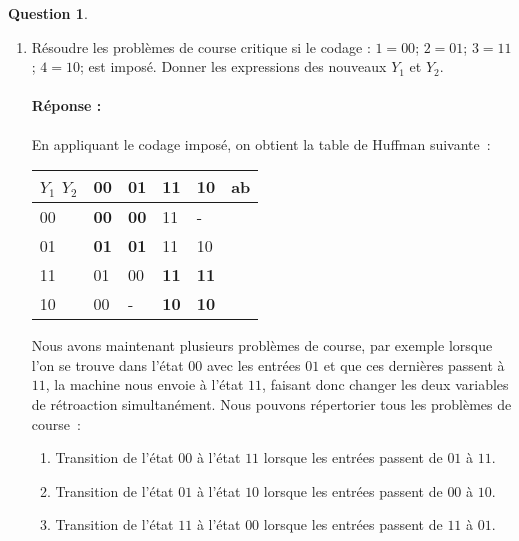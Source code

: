 \documentclass[11pt,a4paper,dvipsnames,]{article}
\theoremstyle{definition}%
\newtheorem{Q}{Question}[] %
\newcommand{\reponse}[1]{%
	\ifthenelse {\boolean{corrige}} {\paragraph{Réponse :} \color{darkblue}   #1\color{black}} {}
 }
\begin{document}
\begin{Q}
\begin{enumerate}
{			Attention~: lors de l'établissement des k-maps, il faut veiller à réordonner la table pour respecter une distance de Hamming de 1 entre les cases voisines.

			\begin{center}

			\end{center}


		}
		\item Résoudre les problèmes de course critique si le codage : $1 = 00$; $2 = 01$; $3 = 11$; $4 = 10$; est
		imposé. Donner les expressions des nouveaux $Y_1$ et $Y_2$.

		\reponse{
			En appliquant le codage imposé, on obtient la table de Huffman suivante~:
			\begin{center}
				\begin{tabular}{|l|l|l|l|l|l}
				\hline
				 $Y_1$ $Y_2$ & 00         & 01         & 11         & 10         & \multicolumn{1}{l|}{ab} \\ \hline
				00 & \textbf{00} & \textbf{00} & 11          & -          &    \\ \cline{1-5}
				01 & \textbf{01} & \textbf{01} & 11          & 10          &    \\ \cline{1-5}
				11 & 01          & 00          & \textbf{11} & \textbf{11} &    \\ \cline{1-5}
				10 & 00          & -          & \textbf{10} & \textbf{10} &    \\ \cline{1-5}
				\end{tabular}
			\end{center}

			Nous avons maintenant plusieurs problèmes de course, par exemple lorsque l'on se trouve dans l'état $00$ avec les entrées $01$ et que ces dernières passent à $11$, la machine nous envoie à l'état $11$, faisant donc changer les deux variables de rétroaction simultanément.
			Nous pouvons répertorier tous les problèmes de course~:
			\begin{enumerate}
				\item Transition de l'état $00$ à l'état $11$ lorsque les entrées passent de $01$ à $11$.
				\item Transition de l'état $01$ à l'état $10$ lorsque les entrées passent de $00$ à $10$.
				\item Transition de l'état $11$ à l'état $00$ lorsque les entrées passent de $11$ à $01$.
			\end{enumerate}

}
\end{enumerate}
\end{Q}
\end{document}
